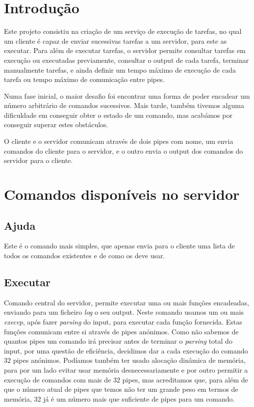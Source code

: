 \documentclass[a4paper]{report}
\begin{document}
	\tableofcontents
	
	\pagebreak
	
	\chapter{Introdução}
%	
	Este projeto consistiu na criação de um serviço de execução de tarefas, no qual um cliente é capaz de enviar sucessivas tarefas a um servidor, para este as executar.
	Para além de executar tarefas, o servidor permite consultar tarefas em execução ou executadas previamente, consultar o output de cada tarefa, terminar manualmente tarefas, e ainda definir um tempo máximo de execução de cada tarefa ou tempo máximo de comunicação entre pipes.
	
	Numa fase inicial, o maior desafio foi encontrar uma forma de poder encadear um número arbitrário de comandos sucessivos. Mais tarde, também tivemos alguma dificuldade em conseguir obter o estado de um comando, mas acabámos por conseguir superar estes obstáculos.
	
	O cliente e o servidor comunicam através de dois pipes com nome, um envia comandos do cliente para o servidor, e o outro envia o output dos comandos do servidor para o cliente.
	
	\chapter{Comandos disponíveis no servidor}
	\section{Ajuda}
	Este é o comando mais simples, que apenas envia para o cliente uma lista de todos os comandos existentes e de como os deve usar.
	
	\section{Executar}
	Comando central do servidor, permite executar uma ou mais funções encadeadas, enviando para um ficheiro \emph{log} o seu output. Neste comando usamos um ou mais \emph{execvp}, após fazer \textit{parsing} do input, para executar cada função fornecida. Estas funções comunicam entre si através de pipes anónimos. Como não sabemos de quantos pipes um comando irá precisar antes de terminar o \textit{parsing} total do input, por uma questão de eficiência, decidimos dar a cada execução do comando 32 pipes anónimos. Podíamos também ter usado alocação dinâmica de memória, para por um lado evitar usar memória desnecessariamente e por outro permitir a execução de comandos com mais de 32 pipes, mas acreditamos que, para além de que o número atual de pipes que temos não ter um grande peso em termos de memória, 32 já é um número mais que suficiente de pipes para um comando.
\end{document}
